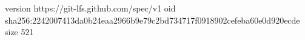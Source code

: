 version https://git-lfs.github.com/spec/v1
oid sha256:2242007413da0b24eaa2966b9e79c2bd734717f0918902cefeba60e0d920ecde
size 521
